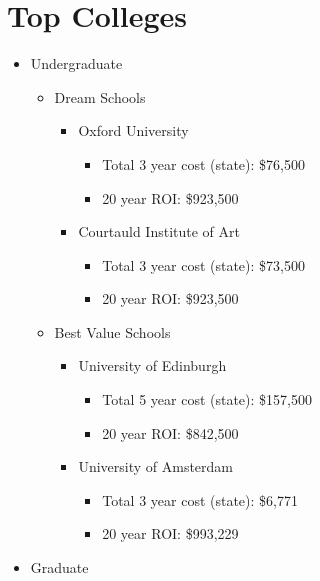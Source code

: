 \section{Top Colleges}
\begin{itemize}
    \item{Undergraduate} 
    \begin{itemize}
        \item{Dream Schools}
            \begin{itemize}
                \item{Oxford University}
                    \begin{itemize}
                        \item{Total 3 year cost (state):} \$76,500 
                        \item{20 year ROI:} \$923,500
                    \end{itemize}
                \item{Courtauld Institute of Art}
                    \begin{itemize}
                        \item{Total 3 year cost (state):} \$73,500 
                        \item{20 year ROI:} \$923,500 
                    \end{itemize}
            \end{itemize}
        \item{Best Value Schools} 
            \begin{itemize}
                \item{University of Edinburgh}
                    \begin{itemize}
                        \item{Total 5 year cost (state):} \$157,500 
                        \item{20 year ROI:} \$842,500 
                    \end{itemize}
                \item{University of Amsterdam}
                    \begin{itemize}
                        \item{Total 3 year cost (state):} \$6,771 
                        \item{20 year ROI:} \$993,229
                    \end{itemize}
            \end{itemize}
    \end{itemize}
    \item{Graduate} 

\end{itemize}
